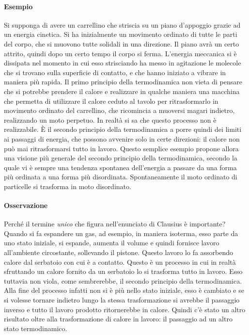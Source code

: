 \paragraph{Esempio} Si supponga di avere un carrellino che striscia su un piano d'appoggio grazie ad un energia cinetica. Si ha inizialmente un movimento ordinato di tutte le parti del corpo, che si muovono tutte solidali in una direzione. Il piano avrà un certo attrito, quindi dopo un certo tempo il corpo si ferma. L'energia meccanica si è dissipata nel momento in cui esso strisciando ha messo in agitazione le molecole che si trovano sulla superficie di contatto, e che hanno iniziato a vibrare in maniera più rapida. Il primo principio della termodinamica non vieta di pensare che si potrebbe prendere il calore e realizzare in qualche maniera una macchina che permetta di utilizzare il calore ceduto al tavolo per ritrasformarlo in movimento ordinato del carrellino, che ricomincia a muoversi magari indietro, realizzando un moto perpetuo. In realtà si sa che questo processo non è realizzabile. È il secondo principio della termodinamica a porre quindi dei limiti ai passaggi di energia, che possono avvenire solo in certe direzioni: il calore non può mai ritrasformarsi tutto in lavoro. Questo semplice esempio propone allora una visione più generale del secondo principio della termodinamica, secondo la quale vi è sempre una tendenza spontanea dell'energia a passare da una forma più ordinata a una forma più disordinata. Spontaneamente il moto ordinato di particelle si trasforma in moto disordinato.

\paragraph{Osservazione} Perché il termine \emph{unico} che figura nell'enunciato di Clausius è importante? Quando si fa espandere un gas, ad esempio, in maniera isoterma, esso parte da uno stato iniziale, si espande, aumenta il volume e quindi fornisce lavoro all'ambiente circostante, sollevando il pistone. Questo lavoro lo fa assorbendo calore dal serbatoio con cui è a contatto.
Questo è un processo in cui in realtà sfruttando un calore fornito da un serbatoio lo si trasforma tutto in lavoro. Esso tuttavia non viola, come sembrerebbe, il secondo principio della termodinamica. Alla fine del processo infatti non si è più nello stato iniziale, esso è cambiato e se si volesse tornare indietro lungo la stessa trasformazione si avrebbe il passaggio inverso e tutto il lavoro prodotto ritornerebbe in calore. Quindi c'è stato un altro risultato oltre alla trasformazione di calore in lavoro: il passaggio ad un altro stato termodinamico.

